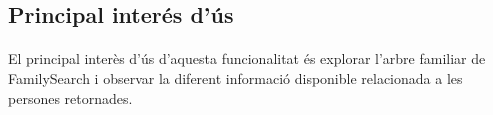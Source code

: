 \subsection{Principal interés d'ús}

\paragraph{}
El principal interès d'ús d'aquesta funcionalitat és explorar l'arbre familiar de FamilySearch i observar la diferent informació disponible relacionada a les persones retornades.
